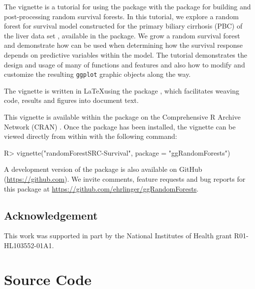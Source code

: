 \documentclass[article]{jss}
\begin{document}
The vignette is a tutorial for using the  package
with the  package for building and post-processing
random survival forests. In this tutorial, we explore a random forest
for survival model constructed for the primary biliary cirrhosis (PBC)
of the liver data set \citep{fleming:1991}, available in the
 package. We grow a random survival forest and
demonstrate how  can be used when determining how
the survival response depends on predictive variables within the model.
The tutorial demonstrates the design and usage of many of
 functions and features and also how to modify and
customize the resulting \texttt{ggplot} graphic objects along the way.

The vignette is written in \LaTeX using the  package
\citep[\url{http://CRAN.R-project.org/package=knitr}]{Xie:2015, Xie:2014,Xie:2013},
which facilitates weaving  \citep{rcore} code, results and
figures into document text.

This vignette is available within the  package on
the Comprehensive R Archive Network (CRAN)
\citep[\url{http://cran.r-project.org}]{rcore}. Once the package has
been installed, the vignette can be viewed directly from within
 with the following command:

\begin{Schunk}
\begin{Sinput}
R> vignette("randomForestSRC-Survival", package = "ggRandomForests")
\end{Sinput}
\end{Schunk}

A development version of the  package is also
available on GitHub (\url{https://github.com}). We invite comments,
feature requests and bug reports for this package at
\url{https://github.com/ehrlinger/ggRandomForests}.

\subsection{Acknowledgement}\label{acknowledgement}

This work was supported in part by the National Institutes of Health
grant R01-HL103552-01A1.

\appendix

\section{Source Code}\label{source-code}
\end{document}
